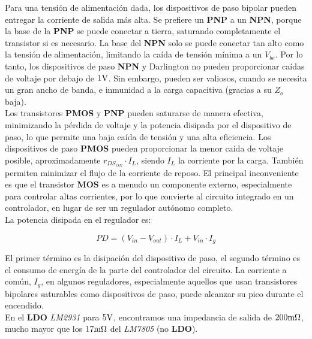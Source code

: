 Para una tensión de alimentación dada, los dispositivos de paso bipolar pueden entregar la corriente de salida más alta. Se prefiere un \textbf{PNP} a un \textbf{NPN}, porque la base de la \textbf{PNP} se puede conectar a tierra, saturando completamente el transistor si es necesario. La base del \textbf{NPN} solo se puede conectar tan alto como la tensión de alimentación, limitando la caída de tensión mínima a un $V_{be}$. Por lo tanto, los dispositivos de paso \textbf{NPN} y Darlington no pueden proporcionar caídas de voltaje por debajo de $1 \si[per-mode=symbol]{\volt}$. Sin embargo, pueden ser valiosos, cuando se necesita un gran ancho de banda, e inmunidad a la carga capacitiva (gracias a su $Z_{o}$ baja).\\
Los transistores \textbf{PMOS} y \textbf{PNP} pueden saturarse de manera efectiva, minimizando la pérdida de voltaje y la potencia disipada por el dispositivo de paso, lo que permite una baja caída de tensión y una alta eficiencia. Los dispositivos de paso \textbf{PMOS} pueden proporcionar la menor caída de voltaje posible, aproximadamente $r_{DS_{ON}} \cdot I_{L}$, siendo $I_{L}$ la corriente por la carga. También permiten minimizar el flujo de la corriente de reposo. El principal inconveniente es que el transistor \textbf{MOS} es a menudo un componente externo, especialmente para controlar altas corrientes, por lo que convierte al circuito integrado en un controlador, en lugar de ser un regulador autónomo completo. \\
La potencia disipada en el regulador es:

\begin{equation*}
PD = \left( V_{in} - V_{out} \right) \cdot I_{L} + V_{in} \cdot I_{g}
\end{equation*}


El primer término es la disipación del dispositivo de paso, el segundo término es el consumo de energía de la parte del controlador del circuito. La corriente a común, $I_{g}$, en algunos reguladores, especialmente aquellos que usan transistores bipolares saturables como dispositivos de paso, puede alcanzar su pico durante el encendido.\\
En el \textbf{LDO} \textit{LM2931} para $5 \si[per-mode=symbol]{\volt}$, encontramos una impedancia de salida de $200 \si[per-mode=symbol]{\milli\ohm}$, mucho mayor que los $17 \si[per-mode=symbol]{\milli\ohm}$ del \textit{LM7805} (no \textbf{LDO}).












\clearpage